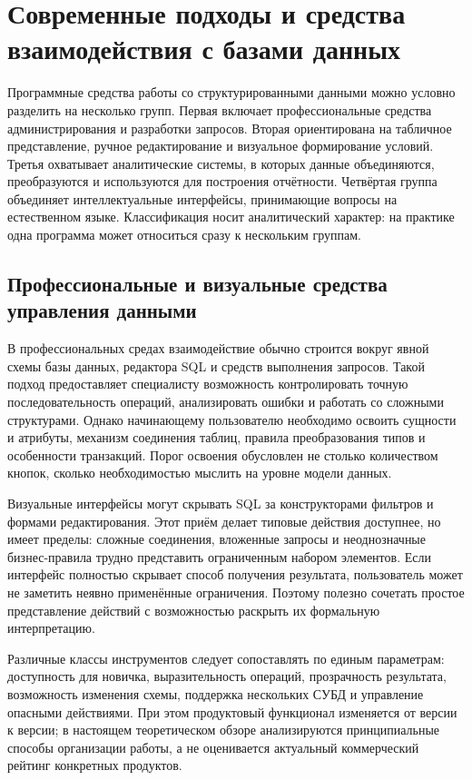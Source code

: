 \clearpage
\section{Современные подходы и средства взаимодействия с базами данных}

Программные средства работы со структурированными данными можно условно разделить на несколько групп. Первая включает профессиональные средства администрирования и разработки запросов. Вторая ориентирована на табличное представление, ручное редактирование и визуальное формирование условий. Третья охватывает аналитические системы, в которых данные объединяются, преобразуются и используются для построения отчётности. Четвёртая группа объединяет интеллектуальные интерфейсы, принимающие вопросы на естественном языке. Классификация носит аналитический характер: на практике одна программа может относиться сразу к нескольким группам.

\subsection{Профессиональные и визуальные средства управления данными}

В профессиональных средах взаимодействие обычно строится вокруг явной схемы базы данных, редактора SQL и средств выполнения запросов. Такой подход предоставляет специалисту возможность контролировать точную последовательность операций, анализировать ошибки и работать со сложными структурами. Однако начинающему пользователю необходимо освоить сущности и атрибуты, механизм соединения таблиц, правила преобразования типов и особенности транзакций. Порог освоения обусловлен не столько количеством кнопок, сколько необходимостью мыслить на уровне модели данных.

Визуальные интерфейсы могут скрывать SQL за конструкторами фильтров и формами редактирования. Этот приём делает типовые действия доступнее, но имеет пределы: сложные соединения, вложенные запросы и неоднозначные бизнес-правила трудно представить ограниченным набором элементов. Если интерфейс полностью скрывает способ получения результата, пользователь может не заметить неявно применённые ограничения. Поэтому полезно сочетать простое представление действий с возможностью раскрыть их формальную интерпретацию.

Различные классы инструментов следует сопоставлять по единым параметрам: доступность для новичка, выразительность операций, прозрачность результата, возможность изменения схемы, поддержка нескольких СУБД и управление опасными действиями. При этом продуктовый функционал изменяется от версии к версии; в настоящем теоретическом обзоре анализируются принципиальные способы организации работы, а не оценивается актуальный коммерческий рейтинг конкретных продуктов.

